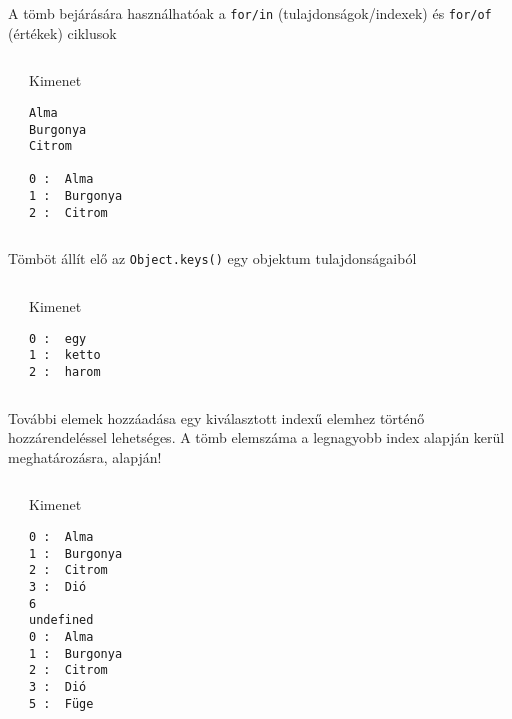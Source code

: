 \begin{frame}[fragile]
  A tömb bejárására használhatóak a \texttt{for/in} (tulajdonságok/indexek) és \texttt{for/of} (értékek) ciklusok
  \footnotesize
  \begin{columns}[T]
      \begin{exampleblock}{}
        
      \end{exampleblock}
      \begin{block}{Kimenet}
        \begin{verbatim}
Alma
Burgonya
Citrom

0 :  Alma
1 :  Burgonya
2 :  Citrom
\end{verbatim}
      \end{block}
  \end{columns}
\end{frame}

\begin{frame}[fragile]
  Tömböt állít elő az \texttt{Object.keys()} egy objektum tulajdonságaiból
  \small
  \begin{columns}[T]
      \begin{exampleblock}{}
        
      \end{exampleblock}
      \begin{block}{Kimenet}
        \begin{verbatim}
0 :  egy
1 :  ketto
2 :  harom
\end{verbatim}
      \end{block}
  \end{columns}
\end{frame}

\begin{frame}[fragile]
  További elemek hozzáadása egy kiválasztott indexű elemhez történő hozzárendeléssel lehetséges. A tömb elemszáma a legnagyobb index alapján kerül meghatározásra,  alapján!
  \footnotesize
  \begin{columns}[T]
      \begin{exampleblock}{}
        
      \end{exampleblock}
      \begin{block}{Kimenet}
        \begin{verbatim}
0 :  Alma
1 :  Burgonya
2 :  Citrom
3 :  Dió
6
undefined
0 :  Alma
1 :  Burgonya
2 :  Citrom
3 :  Dió
5 :  Füge
\end{verbatim}
      \end{block}
  \end{columns}
\end{frame}

